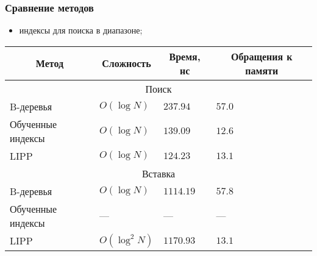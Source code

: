 \documentclass{bmstu-pr}
\begin{document}
\begin{frame}
    \frametitle{Сравнение методов}

    \begin{itemize}
        \item индексы для поиска в диапазоне;
    \end{itemize}
{
\fontsize{24pt}{24pt}\selectfont
\captionsetup{format=hang,justification=raggedright,
              singlelinecheck=off,width=17cm}
\begin{longtable}[Hc]{|p{8cm}|p{2cm}|p{2cm}|p{4.8cm}|}
    \hline
    \multicolumn{1}{|c|}{\textbf{Метод}} &
    \multicolumn{1}{c|}{\textbf{Сложность}} &
    \multicolumn{1}{c|}{\textbf{Время, нс}} &
    \multicolumn{1}{c|}{\parbox{4.8cm}{\vspace{2mm}\centering\textbf{Обращения к
    памяти}}}\\[2.2ex]
    \hline
    \multicolumn{4}{|c|}{\parbox{3cm}{\centering\vspace{1mm}Поиск}}\\

    \hline
    B-деревья & $O(\log N)$
    & $237.94$
    & $57.0$\\
    \hline
    Обученные индексы & $O(\log N)$
    & $139.09$
    & $12.6$\\
    \hline
    LIPP & $O(\log N)$
         & \color{white}$1$\color{black}$24.23$
    & \color{white}$1$\color{black}$3.1$\\
    \hline
    \multicolumn{4}{|c|}{\parbox{3cm}{\centering\vspace{1mm}Вставка}}\\
    \hline
    B-деревья
    & $O(\log N)$
    & $1114.19$
    & $57.8$\\
    \hline
    Обученные индексы
    & ---
    & ---
    & ---\\
    \hline
    LIPP
    & $O(\log^2 N)$
    & \color{white}$11$\color{black}$70.93$
    & \color{white}$1$\color{black}$3.1$\\
    \hline
\end{longtable}
}
\end{frame}
\end{document}
